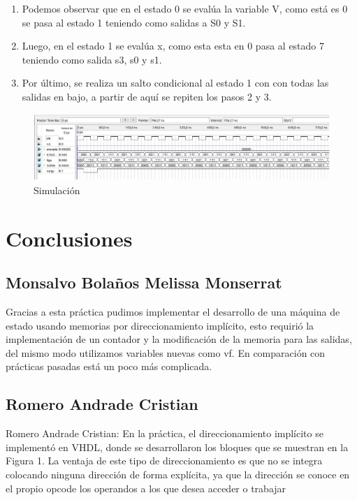 \documentclass[table]{scrartcl}
\begin{document}
\begin{enumerate}
  \item Podemos observar que en el estado 0 se evalúa la variable V, como está
        es 0 se pasa al estado 1 teniendo como salidas a S0 y S1.
  \item Luego, en el estado 1 se evalúa x, como esta esta en 0 pasa al estado 7
        teniendo como salida s3, s0 y s1.
  \item Por último, se realiza un salto condicional al estado 1 con con todas las
        salidas en bajo, a partir de aquí se repiten los pasos 2 y 3.
\end{enumerate}
\begin{figure}[H]
  \centering
    \includegraphics[width=\textwidth]{./img/sim}
  \caption{Simulación}\label{fig:sim}
\end{figure}

\section{Conclusiones}
\label{sec:orgdab2190}

\subsection*{Monsalvo Bolaños Melissa Monserrat}\label{sec:mons-bolan-melissa}
Gracias a esta práctica pudimos implementar el desarrollo de una máquina de
estado usando memorias por direccionamiento implícito, esto requirió la
implementación de un contador y la modificación de la memoria para las salidas,
del mismo modo utilizamos variables nuevas como vf. En comparación con prácticas
pasadas está un poco más complicada.

\subsection*{Romero Andrade Cristian}\label{sec:romero-andr-crist}

Romero Andrade Cristian: En la práctica, el direccionamiento implícito se
implementó en VHDL, donde se desarrollaron los bloques que se muestran en la
Figura 1. La ventaja de este tipo de direccionamiento es que no se integra
colocando ninguna dirección de forma explícita, ya que la dirección se conoce en
el propio opcode los operandos a los que desea acceder o trabajar
\end{document}
